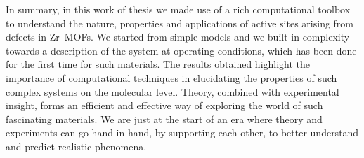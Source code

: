 \npar
In summary, in this work of thesis we made use of a rich computational toolbox to understand the nature, properties and applications of active sites arising from defects in Zr--MOFs. We started from simple models and we built in complexity towards a description of the system at operating conditions, which has been done for the first time for such materials. The results obtained highlight the importance of computational techniques in elucidating the properties of such complex systems on the molecular level. Theory, combined with experimental insight, forms an efficient and effective way of exploring the world of such fascinating materials. We are just at the start of an era where theory and experiments can go hand in hand, by supporting each other, to better understand and predict realistic phenomena.


